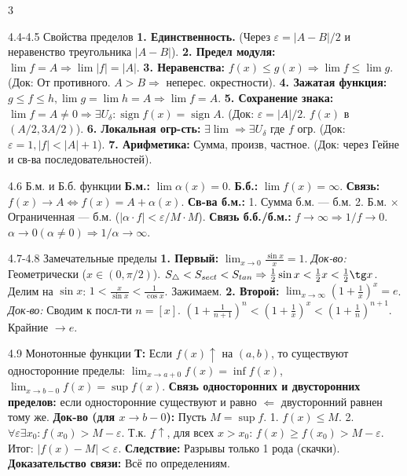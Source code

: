 \documentclass[8pt, a4paper, landscape]{extarticle}
\newcommand{\Ra}{\Rightarrow}
\newcommand{\eps}{\varepsilon}
\DeclareMathOperator{\sign}{sign}
\begin{document}
\begin{multicols*}{3}
\begin{ticket}{4.4-4.5 Свойства пределов}
\textbf{1. Единственность.} (Через $\eps = |A-B|/2$ и неравенство треугольника $|A - B|$).
\textbf{2. Предел модуля:} $\lim f=A \Ra \lim |f|=|A|$.
\textbf{3. Неравенства:} $f(x) \le g(x) \Ra \lim f \le \lim g$.
(Док: От противного. $A > B \Ra$ неперес. окрестности).
\textbf{4. Зажатая функция:} $g \le f \le h, \lim g = \lim h = A \Ra \lim f = A$.
\textbf{5. Сохранение знака:} $\lim f = A \ne 0 \Ra \exists U_\delta: \sign f(x) = \sign A$.
(Док: $\eps = |A|/2$. $f(x)$ в $(A/2, 3A/2)$).
\textbf{6. Локальная огр-сть:} $\exists \lim \Ra \exists U_\delta$ где $f$ огр.
(Док: $\eps=1, |f| < |A|+1$).
\textbf{7. Арифметика:} Сумма, произв, частное.
(Док: через Гейне и св-ва последовательностей).
\end{ticket}

\begin{ticket}{4.6 Б.м. и Б.б. функции}
\textbf{Б.м.:} $\lim \alpha(x) = 0$. \textbf{Б.б.:} $\lim f(x) = \infty$.
\textbf{Связь:} $f(x) \to A \iff f(x) = A + \alpha(x)$.
\textbf{Св-ва б.м.:}
1. Сумма б.м. — б.м.
2. Б.м. $\times$ Ограниченная — б.м. ($|\alpha \cdot f| < \eps/M \cdot M$).
\textbf{Связь б.б./б.м.:}
$f \to \infty \Ra 1/f \to 0$.
$\alpha \to 0 (\alpha \ne 0) \Ra 1/\alpha \to \infty$.
\end{ticket}

\begin{ticket}{4.7-4.8 Замечательные пределы}
\textbf{1. Первый:} $\lim_{x\to 0} \frac{\sin x}{x} = 1$.
\textit{Док-во:} Геометрически ($x \in (0, \pi/2)$).
$S_{\triangle} < S_{sect} < S_{tan} \Ra \frac{1}{2}\sin x < \frac{1}{2}x < \frac{1}{2}\tg x$.
Делим на $\sin x$: $1 < \frac{x}{\sin x} < \frac{1}{\cos x}$. Зажимаем.
\textbf{2. Второй:} $\lim_{x\to \infty} (1+\frac{1}{x})^x = e$.
\textit{Док-во:} Сводим к посл-ти $n=[x]$.
$(1+\frac{1}{n+1})^n < (1+\frac{1}{x})^x < (1+\frac{1}{n})^{n+1}$.
Крайние $\to e$.
\end{ticket}

\begin{ticket}{4.9 Монотонные функции}
\textbf{Т:} Если $f(x) \uparrow$ на $(a, b)$, то существуют односторонние пределы:
$\lim_{x\to a+0} f(x) = \inf f(x)$, $\lim_{x\to b-0} f(x) = \sup f(x)$.
\textbf{Связь односторонних и двусторонних пределов:} если односторонние существуют и равно $\Leftarrow$ двусторонний равнен тому же.
\tcblower
\textbf{Док-во (для $x \to b-0$):}
Пусть $M = \sup f$.
1. $f(x) \le M$.
2. $\forall \eps \exists x_0: f(x_0) > M-\eps$.
Т.к. $f \uparrow$, для всех $x > x_0$: $f(x) \ge f(x_0) > M-\eps$.
Итог: $|f(x)-M| < \eps$.
\textbf{Следствие:} Разрывы только 1 рода (скачки).
\textbf{Доказательство связи:} Всё по определениям. 
\end{ticket}


\end{multicols*}
\end{document}

